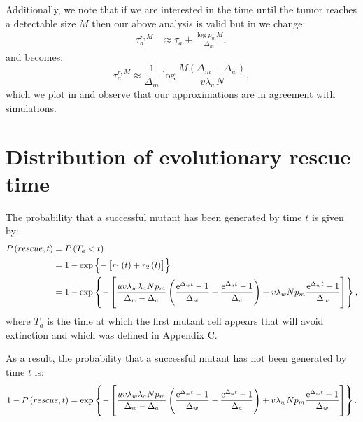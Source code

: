 \documentclass[12pt]{extarticle}
\newcommand{\e}{{\rm e}}
\begin{document}
\begin{appendices}
Additionally, we note that if we are interested in the time until the tumor reaches a detectable size $M$ then our above analysis is valid but in  we change:
\begin{align}\label{meanproliferationtime2}
\tau_a^{r,M}&\approx\tau_a+\frac{\log p_mM}{\Delta_m},
\end{align}
and  becomes:
\begin{equation}\label{eq:t2det2}
\tau_a^{r,M}\approx\frac{1}{\Delta_m}\log\frac{M\left(\Delta_m-\Delta_w\right)}{v\lambda_wN},
\end{equation}
which we plot in  and observe that our approximations are in agreement with simulations.

\section{Distribution of evolutionary rescue time}
The probability that a successful mutant has been generated by time $t$ is given by:
\begin{align*}
P\left(rescue,t\right)&=P\left(T_a<t\right)\\
&=1-\exp\left\{-\left[r_1\left(t\right)+r_2\left(t\right)\right]\right\}\\
&=1-\exp\left\{-\left[\frac{uv\lambda_w\lambda_aNp_m}{\Delta_w-\Delta_a}\left(\frac{\e^{\Delta_wt}-1}{\Delta_w}-\frac{\e^{\Delta_at}-1}{\Delta_a}\right)+ v\lambda_wNp_m\frac{\e^{\Delta_w t}-1}{\Delta_w}\right]\right\},
\end{align*}
where $T_a$ is the time at which the first mutant cell appears that will avoid extinction and which was defined in Appendix C.

As a result, the probability that a successful mutant has not been generated by time $t$ is:
\begin{equation}
1-P\left(rescue,t\right)=\exp\left\{-\left[\frac{uv\lambda_w\lambda_aNp_m}{\Delta_w-\Delta_a}\left(\frac{\e^{\Delta_wt}-1}{\Delta_w}-\frac{\e^{\Delta_at}-1}{\Delta_a}\right)+ v\lambda_wNp_m\frac{\e^{\Delta_w t}-1}{\Delta_w}\right]\right\}.
\end{equation}

\end{appendices}
\end{document}
